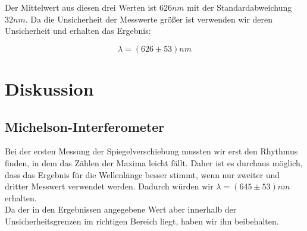 \documentclass{article}
\begin{document}
Der Mittelwert aus diesen drei Werten ist $626nm$ mit der Standardabweichung $32nm$. Da die Unsicherheit der Messwerte größer ist verwenden wir deren Unsicherheit und erhalten das Ergebnis:

$$\boxed{\lambda=(626 \pm 53)nm}$$

\section{Diskussion}	

\subsection{Michelson-Interferometer}
Bei der ersten Messung der Spiegelverschiebung mussten wir erst den Rhythmus finden, in dem das Zählen der Maxima leicht fällt. Daher ist es durchaus möglich, dass das Ergebnis für die Wellenlänge besser stimmt, wenn nur zweiter und dritter Messwert verwendet werden. Dadurch würden wir $\lambda=(645 \pm 53)nm$ erhalten.\\
Da der in den Ergebnissen angegebene Wert aber innerhalb der Unsicherheitsgrenzen im richtigen Bereich liegt, haben wir ihn beibehalten.
																								
\end{document}
